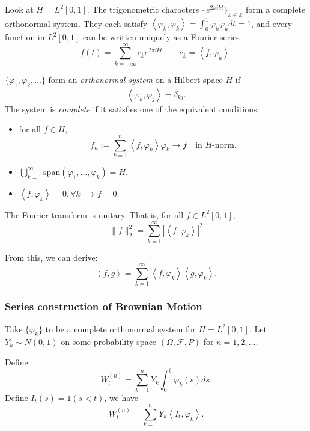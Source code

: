 \begin{example}
	Look at $H = L^2 [0,1]$. The trigonometric characters $\{e^{2 \pi i k t}\}_{k \in \mathbb{Z}} $ form a complete orthonormal system. They each satisfy $\left\langle \varphi_k, \varphi_k \right\rangle  = \int _{0}^1 \overline{\varphi_k} \varphi_k d t = 1$, and every function in $L^2[0,1]$ can be written uniquely as a Fourier series
	\[
		f(t) = \sum_{k=- \infty }^{\infty} c_k e^{2 \pi i k t} \qquad c_k = \left\langle f, \varphi_k \right\rangle 
	.\] 
\end{example}

\begin{definition}
	$\{\varphi_1, \varphi_2, \ldots\} $ form an \textit{orthonormal system} on a Hilbert space $H$ if 
	\[
		\left\langle \varphi_k, \varphi_j \right\rangle = \delta_{kj}
	.\] 
	The system is \textit{complete} if it satisfies one of the equivalent conditions:
	\begin{itemize}
		\item 
	for all $f \in H$,
	\[
		f_n := \sum_{k = 1}^n \left\langle f, \varphi_k \right\rangle \varphi_k \to  f 
		\quad \text{in $H$-norm}
	.\] 
\item  $\bigcup_{k = 1} ^\infty \text{span}(\varphi_1, \ldots, \varphi_k) = H$.
\item $\left\langle f, \varphi_k \right\rangle = 0, \forall k \implies f = 0$.
	\end{itemize}
\end{definition}

\begin{theorem}
	The Fourier transform is unitary. That is, for all $f \in L^2[0,1]$,
	\[
	\|f\|_2^2 = \sum_{k=1}^{\infty} \left| \left\langle f, \varphi_k \right\rangle  \right| ^2
	\]
\end{theorem}
From this, we can derive:
\[
	\left\langle f, g \right\rangle 
	= \sum_{k=1}^{\infty} \left\langle f, \varphi_k \right\rangle \left\langle g, \varphi_k \right\rangle 
.\] 

\subsubsection{Series construction of Brownian Motion}

Take $\{\varphi_k\} $ to be a complete orthonormal system for $H = L^2[0,1]$. Let $Y_k \sim N(0,1)$ on some probability space $(\Omega, \mathcal{F}, P)$ for $n = 1,2,\ldots$.

Define
\[
	W_t^{(n)}
	= \sum_{k=1}^{n} Y_k \int _0^t \varphi_k(s) ds
.\] 
Define $I_t(s) = 1(s < t)$, we have
\begin{equation}
	\label{eqn:BMConstruction}
	W_t^{(n)} = \sum_{k=1}^{n} Y_k \left\langle I_t, \varphi_k \right\rangle 
.\end{equation} 

